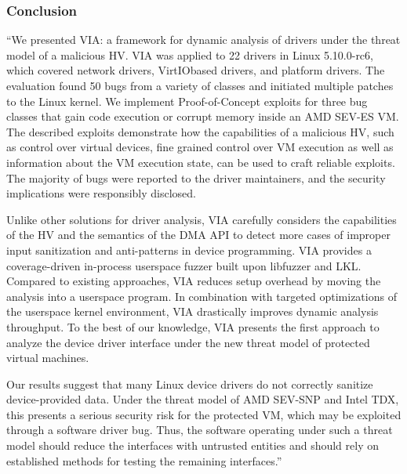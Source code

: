 \subsubsection*{Conclusion  \cite{hetzelt_via_2021} }
“We presented VIA: a framework for dynamic analysis of drivers under the threat model of a malicious HV. VIA was applied to 22 drivers in Linux 5.10.0-rc6, which covered network drivers, VirtIObased drivers, and platform drivers. The evaluation found 50 bugs from a variety of classes and initiated multiple patches to the Linux kernel. We implement Proof-of-Concept exploits for three bug classes that gain code execution or corrupt memory inside an AMD SEV-ES VM. The described exploits demonstrate how the capabilities of a malicious HV, such as control over virtual devices, fine grained control over VM execution as well as information about the VM execution state, can be used to craft reliable exploits. The majority of bugs were reported to the driver maintainers, and the security implications were responsibly disclosed.

Unlike other solutions for driver analysis, VIA carefully considers the capabilities of the HV and the semantics of the DMA API to detect more cases of improper input sanitization and anti-patterns in device programming. VIA provides a coverage-driven in-process userspace fuzzer built upon libfuzzer and LKL. Compared to existing approaches, VIA reduces setup overhead by moving the analysis into a userspace program. In combination with targeted optimizations of the userspace kernel environment, VIA drastically improves dynamic analysis throughput. To the best of our knowledge, VIA presents the first approach to analyze the device driver interface under the new threat model of protected virtual machines.

Our results suggest that many Linux device drivers do not correctly sanitize device-provided data. Under the threat model of AMD SEV-SNP and Intel TDX, this presents a serious security risk for the protected VM, which may be exploited through a software driver bug. Thus, the software operating under such a threat model should reduce the interfaces with untrusted entities and should rely on established methods for testing the remaining interfaces.” 
